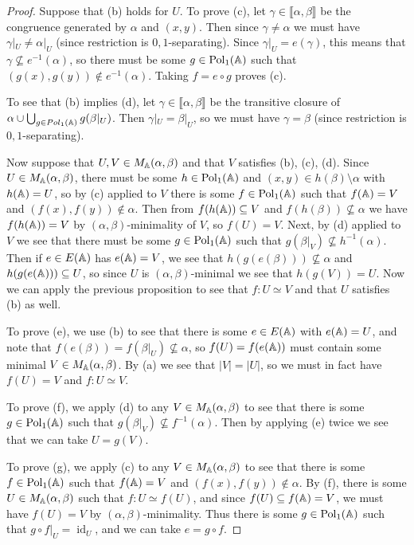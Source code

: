 \begin{appendices}
\begin{proof}
Suppose that (b) holds for $U$. To prove (c), let $\gamma \in \llbracket \alpha, \beta \rrbracket$ be the congruence generated by $\alpha$ and $(x,y)$. Then since $\gamma \ne \alpha$ we must have $\gamma|_U \ne \alpha|_U$ (since restriction is $0,1$-separating). Since $\gamma|_U = e(\gamma)$, this means that $\gamma \not\subseteq e^{-1}(\alpha)$, so there must be some $g \in \operatorname{Pol}_1(\mathbb{A})$ such that $(g(x), g(y)) \not\in e^{-1}(\alpha)$. Taking $f = e\circ g$ proves (c).

To see that (b) implies (d), let $\gamma \in \llbracket \alpha, \beta \rrbracket$ be the transitive closure of $\alpha \cup \bigcup_{g \in Pol_1(\mathbb{A})} g(\beta|_U)$. Then $\gamma|_U = \beta|_U$, so we must have $\gamma = \beta$ (since restriction is $0,1$-separating).

Now suppose that $U,V \in M_{\mathbb{A}}(\alpha, \beta)$ and that $V$ satisfies (b), (c), (d). Since $U \in M_{\mathbb{A}}(\alpha,\beta)$, there must be some $h \in \operatorname{Pol}_1(\mathbb{A})$ and $(x,y) \in h(\beta) \setminus \alpha$ with $h(\mathbb{A}) = U$, so by (c) applied to $V$ there is some $f \in \operatorname{Pol}_1(\mathbb{A})$ such that $f(\mathbb{A}) = V$ and $(f(x), f(y)) \not\in \alpha$. Then from $f(h(\mathbb{A})) \subseteq V$ and $f(h(\beta)) \not\subseteq \alpha$ we have $f(h(\mathbb{A})) = V$ by $(\alpha,\beta)$-minimality of $V$, so $f(U) = V$. Next, by (d) applied to $V$ we see that there must be some $g \in \operatorname{Pol}_1(\mathbb{A})$ such that $g(\beta|_V) \not\subseteq h^{-1}(\alpha)$. Then if $e \in E(\mathbb{A})$ has $e(\mathbb{A}) = V$, we see that $h(g(e(\beta))) \not\subseteq \alpha$ and $h(g(e(\mathbb{A}))) \subseteq U$, so since $U$ is $(\alpha,\beta)$-minimal we see that $h(g(V)) = U$. Now we can apply the previous proposition to see that $f : U \simeq V$ and that $U$ satisfies (b) as well.

To prove (e), we use (b) to see that there is some $e \in E(\mathbb{A})$ with $e(\mathbb{A}) = U$, and note that $f(e(\beta)) = f(\beta|_U) \not\subseteq \alpha$, so $f(U) = f(e(\mathbb{A}))$ must contain some minimal $V \in M_{\mathbb{A}}(\alpha,\beta)$. By (a) we see that $|V| = |U|$, so we must in fact have $f(U) = V$ and $f : U \simeq V$.

To prove (f), we apply (d) to any $V \in M_{\mathbb{A}}(\alpha, \beta)$ to see that there is some $g \in \operatorname{Pol}_1(\mathbb{A})$ such that $g(\beta|_V) \not\subseteq f^{-1}(\alpha)$. Then by applying (e) twice we see that we can take $U = g(V)$.

To prove (g), we apply (c) to any $V \in M_{\mathbb{A}}(\alpha, \beta)$ to see that there is some $f \in \operatorname{Pol}_1(\mathbb{A})$ such that $f(\mathbb{A}) = V$ and $(f(x), f(y)) \not\in \alpha$. By (f), there is some $U \in M_{\mathbb{A}}(\alpha, \beta)$ such that $f : U \simeq f(U)$, and since $f(U) \subseteq f(\mathbb{A}) = V$, we must have $f(U) = V$ by $(\alpha,\beta)$-minimality. Thus there is some $g \in \operatorname{Pol}_1(\mathbb{A})$ such that $g\circ f|_U = \operatorname{id}_U$, and we can take $e = g \circ f$.
\end{proof}


\end{appendices}
